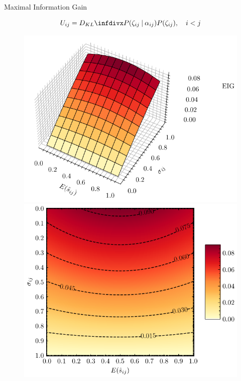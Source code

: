 
\begin{frame}{Maximal Information Gain}

\begin{equation}
\label{eqn:eig_kld}
    U_{ij} = \infdiv{P(\zeta_{ij} \given \alpha_{ij})}{ P(\zeta_{ij}) }, \quad i<j
\end{equation}


\begin{figure}[!htb]
\centering

\begin{minipage}{.49\textwidth}
  \centering
  \includegraphics[width=\textwidth,keepaspectratio]{Images/EIG_3D.pdf}
\end{minipage}%
\begin{minipage}{.49\textwidth}
  \centering
  \includegraphics[width=\textwidth,keepaspectratio]{Images/EIG_2D.pdf}
\end{minipage}
\label{fig:eig}
\end{figure}
    
\end{frame}